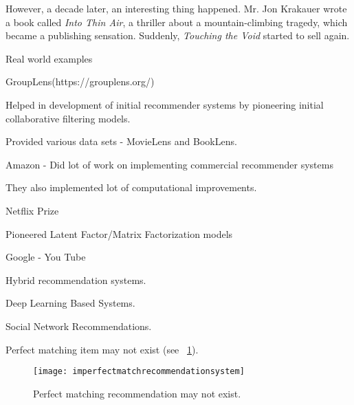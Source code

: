 However, a decade later, an interesting thing happened. Mr. Jon Krakauer wrote a book called \textit{Into Thin Air}, a thriller about a
mountain-climbing tragedy, which became a publishing sensation. Suddenly, \textit{Touching the Void} started to sell again.

Real world examples

	\begin{bulletedlist}
		\item GroupLens(https://grouplens.org/)
		\begin{bulletedlist}
			\item Helped in development of initial recommender systems by pioneering initial collaborative filtering models.
			\item Provided various data sets - MovieLens and BookLens.
		\end{bulletedlist}
		\item Amazon - Did lot of work on implementing commercial recommender systems
		\begin{bulletedlist}
			\item They also implemented lot of computational improvements.
		\end{bulletedlist}
		\item Netflix Prize
		\begin{bulletedlist}
			\item Pioneered Latent Factor/Matrix Factorization models
		\end{bulletedlist}
		\item Google - You Tube
		\begin{bulletedlist}
			\item Hybrid recommendation systems.
			\item Deep Learning Based Systems.
		\end{bulletedlist}
		\item Social Network Recommendations.
	\end{bulletedlist}

Perfect matching item may not exist (see \figurename~\ref{fig:imperfectmatchrecommendationsystem}).

	\begin{figure}[tbh]
		\centering
		\texttt{[image: imperfectmatchrecommendationsystem]}
		\caption[Perfect matching recommendation may not exist]{Perfect matching recommendation may not exist.}
		\label{fig:imperfectmatchrecommendationsystem}
	\end{figure}

